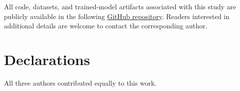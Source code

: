 \documentclass[pdflatex,sn-mathphys-num]{sn-jnl}%
\theoremstyle{thmstyleone}%
\theoremstyle{thmstyletwo}%
\theoremstyle{thmstylethree}%
\begin{document}
\backmatter


All code, datasets, and trained-model artifacts associated with this study are publicly available in the following \href{https://github.com/giwrgoskakepakis/BSc-Thesis-Intelligent-Business-Location-Recommendation}{GitHub repository}. Readers interested in additional details are welcome to contact the corresponding author.






\section*{Declarations}
 
All three authors contributed equally to this work.






\end{document}
